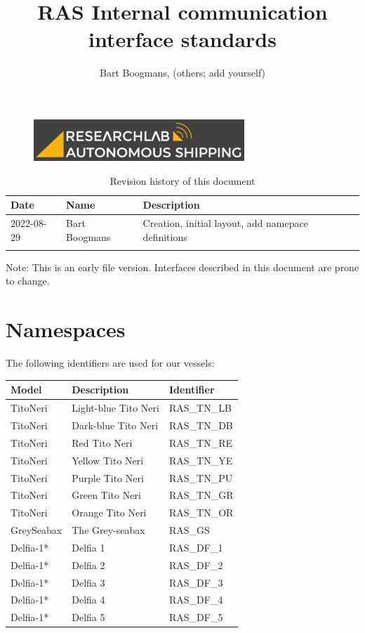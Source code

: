 \documentclass[]{article}
\title{RAS Internal communication interface standards}
\author{Bart Boogmans, (others; add yourself)}
\begin{document}
\maketitle
 
 \begin{figure}[H]
	\centering
	\includegraphics{YW_RAS_logo_GreyBackground.png}
\end{figure}
 
\vfill
\begin{table}[H]
	\centering
	\begin{tabular}{lll}
		Date       & Name          & Description \\ \hline
		2022-08-29 & Bart Boogmans & Creation, initial layout, add namepace definitions  \\
		&               &            
	\end{tabular}
	\caption{Revision history of this document}
\end{table}

Note: This is an early file version. Interfaces described in this document are prone to change. 

\newpage
\section{Namespaces}
The following identifiers are used for our vessels:

\begin{table}[H]
	\centering
	\begin{tabular}{lll}
		Model    & Description          & Identifier  \\ \hline
		TitoNeri & Light-blue Tito Neri & RAS\_TN\_LB \\
		TitoNeri & Dark-blue Tito Neri        & RAS\_TN\_DB \\
		TitoNeri & Red Tito Neri        & RAS\_TN\_RE \\
		TitoNeri & Yellow Tito Neri        & RAS\_TN\_YE \\
		TitoNeri & Purple Tito Neri        & RAS\_TN\_PU \\

		TitoNeri & Green Tito Neri        & RAS\_TN\_GR \\
		TitoNeri & Orange Tito Neri        & RAS\_TN\_OR \\
		GreySeabax & The Grey-seabax        & RAS\_GS \\
		Delfia-1* & Delfia 1       & RAS\_DF\_1 \\
		Delfia-1* & Delfia 2       & RAS\_DF\_2 \\
		Delfia-1* & Delfia 3       & RAS\_DF\_3 \\
		Delfia-1* & Delfia 4       & RAS\_DF\_4 \\
		Delfia-1* & Delfia 5       & RAS\_DF\_5 
		
	\end{tabular}
\end{table}
\end{document}
